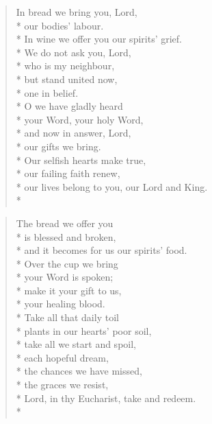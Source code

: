 \documentclass[12pt]{article}
\newcounter{count}
\newcommand\printcount{\addtocounter{count}{1}\thecount}
\begin{document}
\begin{multicols}{2}
\setcounter{count}{0}
\setcounter{count}{0}
\begin{verse}
\flagverse{\printcount.} In bread we bring you, Lord,\\*
our bodies' labour.\\*
In wine we offer you our spirits' grief.\\*
We do not ask you, Lord,\\*
who is my neighbour,\\*
but stand united now,\\*
one in belief.\\*
O we have gladly heard\\*
your Word, your holy Word,\\*
and now in answer, Lord,\\*
our gifts we bring.\\*
Our selfish hearts make true,\\*
our failing faith renew,\\*
our lives belong to you, our Lord and King.\\*
\end{verse}

\begin{verse}
\flagverse{\printcount.} The bread we offer you\\*
is blessed and broken,\\*
and it becomes for us our spirits' food.\\*
Over the cup we bring\\*
your Word is spoken;\\*
make it your gift to us,\\*
your healing blood.\\*
Take all that daily toil\\*
plants in our hearts' poor soil,\\*
take all we start and spoil,\\*
each hopeful dream,\\*
the chances we have missed,\\*
the graces we resist,\\*
Lord, in thy Eucharist, take and redeem.\\*
\end{verse}
\end{multicols}

\newpage
\end{document}
